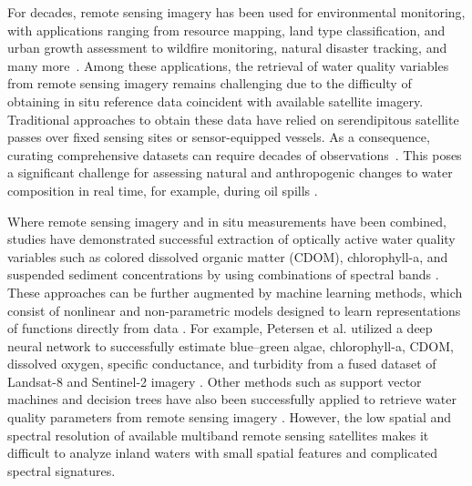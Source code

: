 For decades, remote sensing imagery has been used for environmental monitoring,
with applications ranging from resource mapping, land type classification, and
urban growth assessment to wildfire monitoring, natural disaster tracking, and
many more~\cite{melesse2007remote, joyce2009review}. Among these applications,
the retrieval of water quality variables from remote sensing imagery remains
challenging due to the difficulty of obtaining in situ reference data coincident
with available satellite imagery. Traditional approaches to obtain these data
have relied on serendipitous satellite passes over fixed sensing sites or
sensor-equipped vessels. As a consequence, curating comprehensive datasets can
require decades of observations~\cite{aurin2018remote, ross2019aquasat}. This
poses a significant challenge for assessing natural and anthropogenic changes to
water composition in real time, for example, during oil spills
\cite{fingas2017review}.


Where remote sensing imagery and in situ measurements have been combined,
studies have demonstrated successful extraction of optically active water
quality variables such as colored dissolved organic matter (CDOM),
chlorophyll-a, and suspended sediment concentrations by using combinations of
spectral bands \cite{remote-sensing-finland,bonansea2015using,
  absalon2023detection}. These approaches can be further augmented by machine
learning methods, which consist of nonlinear and non-parametric models designed
to learn representations of functions directly from data
\cite{lary2010artificial}. For example, Petersen et al. utilized a deep neural
network to successfully estimate blue--green algae, chlorophyll-a, CDOM,
dissolved oxygen, specific conductance, and turbidity from a fused dataset of
Landsat-8 and Sentinel-2 imagery \cite{peterson2020deep}. Other methods such as
support vector machines and decision trees have also been successfully applied
to retrieve water quality parameters from remote sensing imagery
\cite{belgiu2016random,sagan2020monitoring}. However, the low spatial and
spectral resolution of available multiband remote sensing satellites makes it
difficult to analyze inland waters with small spatial features and complicated
spectral signatures.


